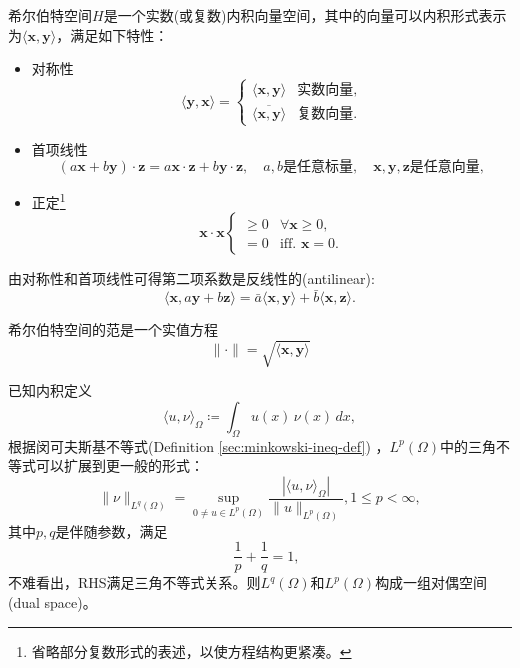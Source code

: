 希尔伯特空间$H$是一个实数(或复数)内积向量空间，其中的向量可以内积形式表示为$\langle \bm{x},\bm{y} \rangle$，满足如下特性：
\begin{itemize}
  \item 对称性
  \begin{equation*}
    \langle \bm{y}, \bm{x} \rangle = \begin{cases}
    \langle \bm{x},\bm{y} \rangle  & \text{实数向量}, \\
    \overline{\langle \bm{x},\bm{y} \rangle}  & \text{复数向量}.
    \end{cases}
  \end{equation*}
  \item 首项线性
  \begin{equation*}
    \left( a \bm{x} + b \bm{y} \right) \cdot \bm{z} = a \bm{x} \cdot \bm{z} + b \bm{y} \cdot \bm{z}, \quad a,b \text{是任意标量}, \quad  \bm{x},\bm{y},\bm{z} \text{是任意向量},
  \end{equation*}
  \item 正定\footnote{省略部分复数形式的表述，以使方程结构更紧凑。}
  \begin{equation*}
    \bm{x} \cdot \bm{x} \begin{cases}
     \ge 0 & \forall \bm{x} \ge 0, \\
     =0 & \text{iff. } \bm{x} = 0.
    \end{cases}
  \end{equation*}
\end{itemize}
由对称性和首项线性可得第二项系数是反线性的(antilinear):
\begin{equation*}
  \langle \bm{x}, a \bm{y} + b \bm{z} \rangle = \bar{a} \langle \bm{x}, \bm{y} \rangle + \bar{b} \langle \bm{x}, \bm{z} \rangle.
\end{equation*}

希尔伯特空间的范是一个实值方程
\begin{equation*}
  \| \cdot \| = \sqrt{\langle \bm{x}, \bm{y} \rangle}
\end{equation*}

\begin{definition}[对偶空间]
已知内积定义
\begin{equation*}
  \langle u,\nu \rangle_{\Omega} \coloneqq \int_{\Omega} u(x) \, \nu(x) \, dx,
\end{equation*}
根据闵可夫斯基不等式(Definition \ref{sec:minkowski-ineq-def}) ，$L^p(\Omega)$中的三角不等式可以扩展到更一般的形式：
\begin{equation*}
  \| \nu \|_{L^{q}(\Omega)} = \sup_{0 \neq u \in L^p(\Omega) } \frac{
  \left| \langle u,\nu \rangle_{\Omega} \right|
  }{
  \| u \|_{L^p(\Omega)}
  }, 1 \le p < \infty,
\end{equation*}
其中$p,q$是伴随参数，满足
\begin{equation*}
\quad \frac{1}{p} + \frac{1}{q} = 1,
\end{equation*}
不难看出，RHS满足三角不等式关系。则$L^q(\Omega)$和$L^p(\Omega)$构成一组对偶空间(dual space)。
\end{definition}

